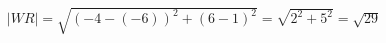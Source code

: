 \documentclass[preview]{standalone}
\begin{document}
\begin{align*}
|WR| = \sqrt{(-4-(-6))^2 + (6-1)^2} = \sqrt{2^2 + 5^2} = \sqrt{29}
\end{align*}
\end{document}
